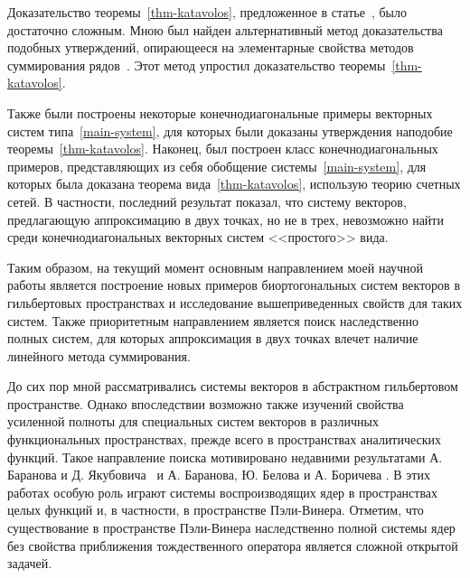 \documentclass[a4paper,12pt]{article}
\numberwithin{prop_under_lemma}{lemma}
\begin{document}
Доказательство теоремы~\ref{thm-katavolos}, предложенное в статье~\cite{katavolos}, было достаточно сложным.
Мною был найден альтернативный метод доказательства подобных утверждений,
  опирающееся на элементарные свойства методов суммирования рядов~\cite{my1}.
Этот метод упростил доказательство теоремы~\ref{thm-katavolos}.

Также были построены некоторые конечнодиагональные примеры векторных систем типа~\eqref{main-system}, для которых были доказаны утверждения наподобие теоремы~\ref{thm-katavolos}.
Наконец, был построен класс конечнодиагональных примеров, представляющих из себя обобщение системы~\eqref{main-system}, для которых была доказана теорема вида~\ref{thm-katavolos},
  использую теорию счетных сетей.
В частности, последний результат показал, что систему векторов, предлагающую аппроксимацию в двух точках, но не в трех, невозможно найти среди конечнодиагональных векторных систем
  <<простого>> вида.

Таким образом, на текущий момент основным направлением моей научной работы является построение новых примеров биортогональных систем векторов 
  в гильбертовых пространствах и исследование вышеприведенных свойств для таких систем.
Также приоритетным направлением является поиск наследственно полных систем, для которых аппроксимация в двух точках влечет наличие линейного метода суммирования.
  
До сих пор мной рассматривались системы векторов в абстрактном гильбертовом пространстве.
Однако впоследствии возможно также изучений свойства усиленной полноты для специальных систем векторов в различных функциональных пространствах,
  прежде всего в пространствах аналитических функций.
Такое направление поиска мотивировано недавними результатами А. Баранова и Д. Якубовича~\cite{ad} и А. Баранова, Ю. Белова и А. Боричева \cite{bbb}.
В этих работах особую роль играют системы воспроизводящих ядер в пространствах целых функций и, в частности, в пространстве Пэли-Винера.
Отметим, что существование в пространстве Пэли-Винера наследственно полной системы ядер без свойства приближения тождественного оператора является сложной открытой задачей.
\end{document}
